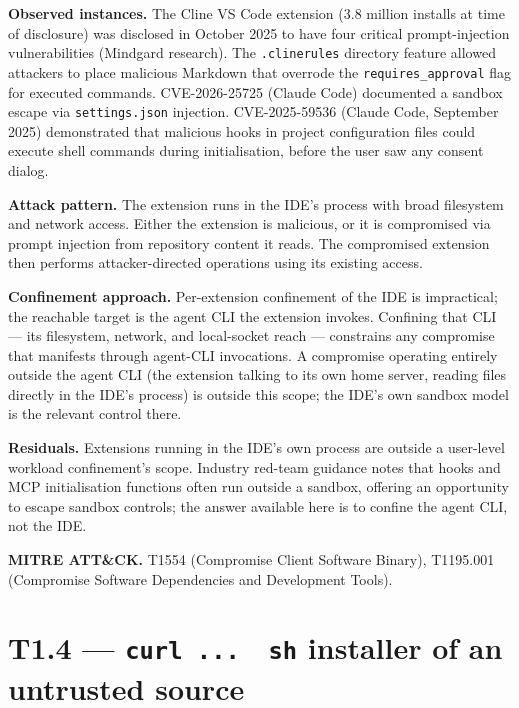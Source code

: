 \textbf{Observed instances.} The Cline VS Code extension (3.8 million
installs at time of disclosure) was disclosed in October 2025 to have
four critical prompt-injection vulnerabilities (Mindgard research). The
\texttt{.clinerules} directory feature allowed attackers to place
malicious Markdown that overrode the \texttt{requires\_approval} flag
for executed commands. CVE-2026-25725 (Claude Code) documented a sandbox
escape via \texttt{settings.json} injection. CVE-2025-59536 (Claude
Code, September 2025) demonstrated that malicious hooks in project
configuration files could execute shell commands during initialisation,
before the user saw any consent dialog.

\textbf{Attack pattern.} The extension runs in the IDE's process with
broad filesystem and network access. Either the extension is malicious,
or it is compromised via prompt injection from repository content it
reads. The compromised extension then performs attacker-directed
operations using its existing access.

\textbf{Confinement approach.} Per-extension confinement of the IDE is
impractical; the reachable target is the agent CLI the extension
invokes. Confining that CLI --- its filesystem, network, and
local-socket reach --- constrains any compromise that manifests through
agent-CLI invocations. A compromise operating entirely outside the agent
CLI (the extension talking to its own home server, reading files
directly in the IDE's process) is outside this scope; the IDE's own
sandbox model is the relevant control there.

\textbf{Residuals.} Extensions running in the IDE's own process are
outside a user-level workload confinement's scope. Industry red-team
guidance notes that hooks and MCP initialisation functions often run
outside a sandbox, offering an opportunity to escape sandbox controls;
the answer available here is to confine the agent CLI, not the IDE.

\textbf{MITRE ATT\&CK.} T1554 (Compromise Client Software Binary),
T1195.001 (Compromise Software Dependencies and Development Tools).

\hypertarget{t1.4-curl-...-sh-installer-of-an-untrusted-source}{%
\section{\texorpdfstring{T1.4 --- \texttt{curl\ ...\ \textbar{}\ sh}
installer of an untrusted
source}{T1.4 --- curl ... \textbar{} sh installer of an untrusted source}}\label{t1.4-curl-...-sh-installer-of-an-untrusted-source}}

